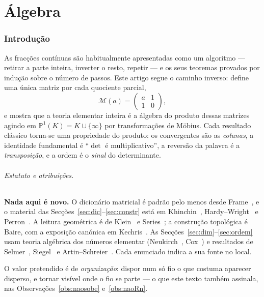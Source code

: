 \documentclass[11pt,a4paper]{article}
\theoremstyle{plain}
\theoremstyle{definition}
\theoremstyle{remark}
\newcommand{\Pj}{\mathbb{P}^1}
\newcommand{\Mat}[1]{\mathcal{M}(#1)}
\begin{document}
\part{Álgebra}


\section{Introdução}\label{sec:intro}

As fracções contínuas são habitualmente apresentadas como um algoritmo --- retirar a parte inteira,
inverter o resto, repetir --- e os seus teoremas provados por indução sobre o número de passos. Este
artigo segue o caminho inverso: define uma única matriz por cada quociente parcial,
\[
  \Mat{a} = \begin{pmatrix} a & 1\\ 1 & 0\end{pmatrix},
\]
e mostra que a teoria elementar inteira é a álgebra do produto dessas matrizes agindo em
$\Pj(K) = K\cup\{\infty\}$ por transformações de Möbius. Cada resultado clássico torna-se uma
propriedade do produto: os convergentes são as \emph{colunas}, a identidade fundamental é
``$\det$ é multiplicativo'', a reversão da palavra é a \emph{transposição}, e a ordem é o
\emph{sinal} do determinante.

\paragraph{Estatuto e atribuições.} \textbf{Nada aqui é novo.} O dicionário matricial é padrão pelo
menos desde Frame~\cite{frame1949}, e o material das Secções~\ref{sec:dic}--\ref{sec:constr} está em
Khinchin~\cite{khinchin}, Hardy--Wright~\cite{hardywright} e Perron~\cite{perron}. A leitura
geométrica é de Klein~\cite{klein1895} e Series~\cite{series1985}; a construção topológica é
Baire, com a exposição canónica em Kechris~\cite{kechris}. As Secções~\ref{sec:dim}--\ref{sec:ordem}
usam teoria algébrica dos números elementar (Neukirch~\cite{neukirch}, Cox~\cite{cox}) e resultados
de Selmer~\cite{selmer1956}, Siegel~\cite{siegel1944} e Artin--Schreier~\cite{lam}. Cada enunciado
indica a sua fonte no local.

O valor pretendido é de \emph{organização}: dispor num só fio o que costuma aparecer disperso, e
tornar visível onde o fio se parte --- o que este texto também assinala, nas
Observações~\ref{obs:naosobe} e~\ref{obs:naoRn}.
\end{document}
